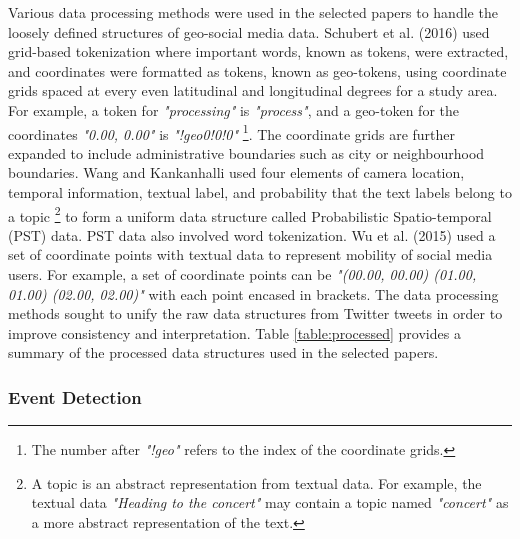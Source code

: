 Various data processing methods were used in the selected papers to handle the loosely defined structures of geo-social media data. Schubert et al. (2016) \cite{Schubert:2016} used grid-based tokenization where important words, known as tokens, were extracted, and coordinates were formatted as tokens, known as geo-tokens, using coordinate grids spaced at every even latitudinal and longitudinal degrees for a study area. For example, a token for \textit{"processing"} is \textit{"process"}, and a geo-token for the coordinates \textit{"0.00, 0.00"} is \textit{"!geo0!0!0"} \footnote{The number after \textit{"!geo"} refers to the index of the coordinate grids.}. The coordinate grids are further expanded to include administrative boundaries such as city or neighbourhood boundaries. Wang and Kankanhalli \cite{Wang:2015} used four elements of camera location, temporal information, textual label, and probability that the text labels belong to a topic \footnote{A topic is an abstract representation from textual data. For example, the textual data \textit{"Heading to the concert"} may contain a topic named \textit{"concert"} as a more abstract representation of the text.} to form a uniform data structure called Probabilistic Spatio-temporal (PST) data. PST data also involved word tokenization. Wu et al. (2015) \cite{Wu:2015} used a set of coordinate points with textual data to represent mobility of social media users. For example, a set of coordinate points can be \textit{"(00.00, 00.00) (01.00, 01.00) (02.00, 02.00)"} with each point encased in brackets. The data processing methods sought to unify the raw data structures from Twitter tweets in order to improve consistency and interpretation.  Table \ref{table:processed} provides a summary of the processed data structures used in the selected papers.

\subsubsection{Event Detection} \label{event-detection}


